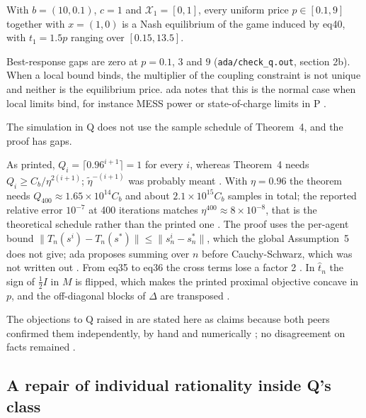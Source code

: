\documentclass{article}
\begin{document}
\begin{claim}
With \(b=(10,0.1)\), \(c=1\) and \(\mathcal{X}_1=[0,1]\), every uniform price \(p\in[0.1,9]\) together with \(x=(1,0)\) is a Nash equilibrium of the game induced by eq40, with \(t_1=1.5p\) ranging over \([0.15,13.5]\). 
\end{claim}

Best-response gaps are zero at \(p=0.1\), \(3\) and \(9\) (\texttt{ada/check\_q.out}, section 2b). When a local bound binds, the multiplier of the coupling constraint is not unique and neither is the equilibrium price. ada notes that this is the normal case when local limits bind, for instance MESS power or state-of-charge limits in P .

\begin{claim}
The simulation in Q does not use the sample schedule of Theorem~4, and the proof has gaps. 
\end{claim}

As printed, \(Q_i=\lceil0.96^{i+1}\rceil=1\) for every \(i\), whereas Theorem~4 needs \(Q_i\ge C_b/\eta^{2(i+1)}\); \(\tilde\eta^{-(i+1)}\) was probably meant . With \(\eta=0.96\) the theorem needs \(Q_{400}\approx1.65\times10^{14}C_b\) and about \(2.1\times10^{15}C_b\) samples in total; the reported relative error \(10^{-7}\) at 400 iterations matches \(\eta^{400}\approx8\times10^{-8}\), that is the theoretical schedule rather than the printed one . The proof uses the per-agent bound \(\|T_n(s^i)-T_n(s^*)\|\le\|s^i_n-s^*_n\|\), which the global Assumption~5 does not give; ada proposes summing over \(n\) before Cauchy-Schwarz, which was not written out . From eq35 to eq36 the cross terms lose a factor 2 . In \(\hat t_n\) the sign of \(\tfrac12I\) in \(M\) is flipped, which makes the printed proximal objective concave in \(p\), and the off-diagonal blocks of \(\Delta\) are transposed .

The objections to Q raised in  are stated here as claims because both peers confirmed them independently, by hand and numerically ; no disagreement on facts remained .

\subsection{A repair of individual rationality inside Q's class}
\end{document}
